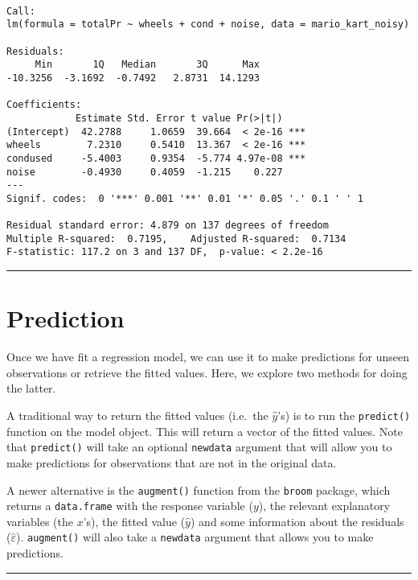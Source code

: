 \documentclass[]{book}
\begin{document}
\begin{verbatim}

Call:
lm(formula = totalPr ~ wheels + cond + noise, data = mario_kart_noisy)

Residuals:
     Min       1Q   Median       3Q      Max 
-10.3256  -3.1692  -0.7492   2.8731  14.1293 

Coefficients:
            Estimate Std. Error t value Pr(>|t|)    
(Intercept)  42.2788     1.0659  39.664  < 2e-16 ***
wheels        7.2310     0.5410  13.367  < 2e-16 ***
condused     -5.4003     0.9354  -5.774 4.97e-08 ***
noise        -0.4930     0.4059  -1.215    0.227    
---
Signif. codes:  0 '***' 0.001 '**' 0.01 '*' 0.05 '.' 0.1 ' ' 1

Residual standard error: 4.879 on 137 degrees of freedom
Multiple R-squared:  0.7195,    Adjusted R-squared:  0.7134 
F-statistic: 117.2 on 3 and 137 DF,  p-value: < 2.2e-16
\end{verbatim}

\begin{center}\rule{0.5\linewidth}{\linethickness}\end{center}

\section{Prediction}\label{prediction}

Once we have fit a regression model, we can use it to make predictions
for unseen observations or retrieve the fitted values. Here, we explore
two methods for doing the latter.

A traditional way to return the fitted values (i.e.~the \(\hat{y}\)'s)
is to run the \texttt{predict()} function on the model object. This will
return a vector of the fitted values. Note that \texttt{predict()} will
take an optional \texttt{newdata} argument that will allow you to make
predictions for observations that are not in the original data.

A newer alternative is the \texttt{augment()} function from the
\texttt{broom} package, which returns a \texttt{data.frame} with the
response variable (\(y\)), the relevant explanatory variables (the
\(x\)'s), the fitted value (\(\hat{y}\)) and some information about the
residuals (\(\hat{\varepsilon}\)). \texttt{augment()} will also take a
\texttt{newdata} argument that allows you to make predictions.

\begin{center}\rule{0.5\linewidth}{\linethickness}\end{center}
\end{document}
